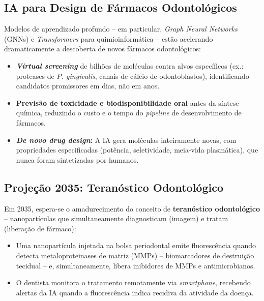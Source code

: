 \subsection{IA para Design de Fármacos Odontológicos}

Modelos de aprendizado profundo -- em particular, \textit{Graph Neural Networks}
(GNNs) e \textit{Transformers} para quimioinformática -- estão acelerando
dramaticamente a descoberta de novos fármacos odontológicos:

\begin{itemize}
  \item \textbf{\textit{Virtual screening}} de bilhões de moléculas contra alvos
    específicos (ex.: proteases de \textit{P. gingivalis}, canais de cálcio de
    odontoblastos), identificando candidatos promissores em dias, não em anos.

  \item \textbf{Previsão de toxicidade e biodisponibilidade oral} antes da
    síntese química, reduzindo o custo e o tempo do \textit{pipeline} de
    desenvolvimento de fármacos.

  \item \textbf{\textit{De novo drug design}:} A IA gera moléculas inteiramente
    novas, com propriedades especificadas (potência, seletividade, meia-vida
    plasmática), que nunca foram sintetizadas por humanos.
\end{itemize}


\subsection{Projeção 2035: Teranóstico Odontológico}

Em 2035, espera-se o amadurecimento do conceito de \textbf{teranóstico
odontológico} -- nanopartículas que simultaneamente diagnosticam (imagem) e
tratam (liberação de fármaco):

\begin{itemize}
  \item Uma nanopartícula injetada na bolsa periodontal emite fluorescência
    quando detecta metaloproteinases de matriz (MMPs) -- biomarcadores de
    destruição tecidual -- e, simultaneamente, libera inibidores de MMPs e
    antimicrobianos.
  \item O dentista monitora o tratamento remotamente via \textit{smartphone},
    recebendo alertas da IA quando a fluorescência indica recidiva da atividade
    da doença.
\end{itemize}

